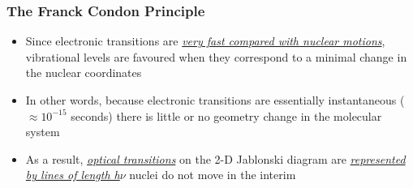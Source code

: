 \documentclass[a4paper,titlepage]{article}
\begin{document}
%
%


\begin{frame}[<+->]
\frametitle{The Franck Condon Principle}
\begin{itemize}
\item Since electronic transitions are \textit{\underline{very fast compared with nuclear motions}}, vibrational levels are favoured when they correspond to a minimal change in the nuclear coordinates
\item In other words, because electronic transitions are essentially instantaneous (\(\approx10^{-15}\) seconds) there is little or no geometry change in the molecular system
\item As a result, \textit{\underline{optical transitions}} on the 2-D Jablonski diagram are \newline \textit{\underline{represented by lines of length h\(\nu\)}} \textemdash nuclei do not move in the interim
\end{itemize}
\end{frame}
\end{document}
